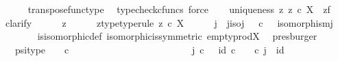 \begin{isabellebody}
\ \ \ \ \isamarkupfalse%
\ transpose{\isacharunderscore}{\kern0pt}func{\isacharunderscore}{\kern0pt}type\ \isamarkupfalse%
\ {\isacharparenleft}{\kern0pt}typecheck{\isacharunderscore}{\kern0pt}cfuncs{\isacharcomma}{\kern0pt}\ force{\isacharparenright}{\kern0pt}\isanewline
\ \ \isamarkupfalse%
\ uniqueness{\isacharcolon}{\kern0pt}\ {\isachardoublequoteopen}{\isasymforall}z{\isachardot}{\kern0pt}\ z\ {\isasymin}\isactrlsub c\ X\isactrlbsup {\isasymemptyset}\isactrlesup \ {\isasymlongrightarrow}\ z{\isacharequal}{\kern0pt}f\isactrlsup {\isasymsharp}{\isachardoublequoteclose}\isanewline
\ \ \isamarkupfalse%
\ clarify\isanewline
\ \ \ \ \isamarkupfalse%
\ z\isanewline
\ \ \ \ \isamarkupfalse%
\ z{\isacharunderscore}{\kern0pt}type{\isacharbrackleft}{\kern0pt}type{\isacharunderscore}{\kern0pt}rule{\isacharbrackright}{\kern0pt}{\isacharcolon}{\kern0pt}\ {\isachardoublequoteopen}z\ {\isasymin}\isactrlsub c\ X\isactrlbsup {\isasymemptyset}\isactrlesup {\isachardoublequoteclose}\isanewline
\ \ \ \ \isamarkupfalse%
\ j\ \ j{\isacharunderscore}{\kern0pt}iso{\isacharcolon}{\kern0pt}{\isachardoublequoteopen}j{\isacharcolon}{\kern0pt}{\isasymemptyset}\ {\isasymrightarrow}\ {\isasymemptyset}\ {\isasymtimes}\isactrlsub c\ {\isasymone}\ {\isasymand}\ isomorphism{\isacharparenleft}{\kern0pt}j{\isacharparenright}{\kern0pt}{\isachardoublequoteclose}\isanewline
\ \ \ \ \ \ \isamarkupfalse%
\ is{\isacharunderscore}{\kern0pt}isomorphic{\isacharunderscore}{\kern0pt}def\ isomorphic{\isacharunderscore}{\kern0pt}is{\isacharunderscore}{\kern0pt}symmetric\ empty{\isacharunderscore}{\kern0pt}prod{\isacharunderscore}{\kern0pt}X\ \isamarkupfalse%
\ presburger\isanewline
\ \ \ \ \isamarkupfalse%
\ {\isasympsi}\ \ psi{\isacharunderscore}{\kern0pt}type{\isacharcolon}{\kern0pt}\ {\isachardoublequoteopen}{\isasympsi}\ {\isacharcolon}{\kern0pt}\ {\isasymemptyset}\ {\isasymtimes}\isactrlsub c\ {\isasymone}\ {\isasymrightarrow}\ {\isasymemptyset}\ {\isasymand}\isanewline
\ \ \ \ \ \ \ \ \ \ \ \ \ \ \ \ \ \ \ \ \ j\ {\isasymcirc}\isactrlsub c\ {\isasympsi}\ {\isacharequal}{\kern0pt}\ id{\isacharparenleft}{\kern0pt}{\isasymemptyset}\ {\isasymtimes}\isactrlsub c\ {\isasymone}{\isacharparenright}{\kern0pt}\ {\isasymand}\ {\isasympsi}\ {\isasymcirc}\isactrlsub c\ j\ {\isacharequal}{\kern0pt}\ id{\isacharparenleft}{\kern0pt}{\isasymemptyset}{\isacharparenright}{\kern0pt}{\isachardoublequoteclose}\isanewline

\end{isabellebody}
